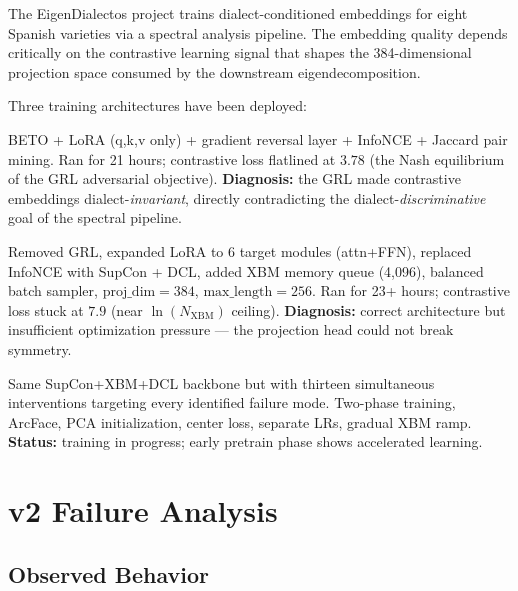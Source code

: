 \documentclass[11pt,a4paper]{article}
\begin{document}
The EigenDialectos project trains dialect-conditioned embeddings for eight
Spanish varieties via a spectral analysis pipeline. The embedding quality
depends critically on the contrastive learning signal that shapes the
384-dimensional projection space consumed by the downstream eigendecomposition.

Three training architectures have been deployed:

\begin{description}[leftmargin=2cm,style=nextline]
\item[\textcolor{v1color}{v1 (GRL)}]
BETO + LoRA (q,k,v only) + gradient reversal layer + InfoNCE + Jaccard pair
mining. Ran for 21 hours; contrastive loss flatlined at $3.78$ (the Nash
equilibrium of the GRL adversarial objective). \textbf{Diagnosis:} the GRL
made contrastive embeddings dialect-\emph{invariant}, directly contradicting
the dialect-\emph{discriminative} goal of the spectral pipeline.

\item[\textcolor{v2color}{v2 (SupCon+XBM+DCL)}]
Removed GRL, expanded LoRA to 6 target modules (attn+FFN), replaced InfoNCE
with SupCon + DCL, added XBM memory queue (4{,}096), balanced batch sampler,
$\text{proj\_dim} = 384$, $\text{max\_length} = 256$. Ran for 23+ hours;
contrastive loss stuck at $7.9$ (near $\ln(N_{\text{XBM}})$ ceiling).
\textbf{Diagnosis:} correct architecture but insufficient optimization
pressure --- the projection head could not break symmetry.

\item[\textcolor{v3color}{v3 (13 interventions)}]
Same SupCon+XBM+DCL backbone but with thirteen simultaneous interventions
targeting every identified failure mode. Two-phase training, ArcFace,
PCA initialization, center loss, separate LRs, gradual XBM ramp.
\textbf{Status:} training in progress; early pretrain phase shows
accelerated learning.
\end{description}

\section{v2 Failure Analysis}

\subsection{Observed Behavior}
\end{document}
